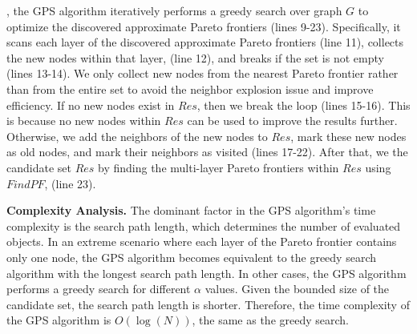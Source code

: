 , the GPS algorithm iteratively performs a greedy search over graph $G$ to optimize the discovered approximate %
Pareto frontiers (lines 9-23). Specifically, it scans each layer of the discovered approximate Pareto frontiers (line 11), collects the new nodes within that layer,   (line 12), and breaks if the set is not empty (lines 13-14). %
We only collect new nodes from the nearest Pareto frontier rather than from the entire set to avoid the neighbor explosion issue and improve efficiency. If no new nodes exist in $Res$, then we break the loop (lines 15-16). This is because no new nodes within $Res$ can be used to improve the results further. Otherwise, we add the neighbors of the new nodes to $Res$, mark these new nodes as old nodes, and mark their neighbors as visited (lines 17-22). After that, we   the candidate set $Res$ by finding the multi-layer Pareto frontiers within $Res$ using $FindPF$,   %
(line 23). %



\noindent\textbf{Complexity Analysis.} %
The dominant factor in the GPS algorithm's time complexity is the search path length, which determines the number of evaluated objects. In an extreme scenario where each layer of the Pareto frontier contains only one node, the GPS algorithm becomes equivalent to the greedy search algorithm with the longest search path length. In other cases, the GPS algorithm performs a greedy search for different $\alpha$ values. Given the bounded size of the candidate set, the search path length is shorter. Therefore, the time complexity of the GPS algorithm is $O(\log(N))$, the same as the greedy search.




